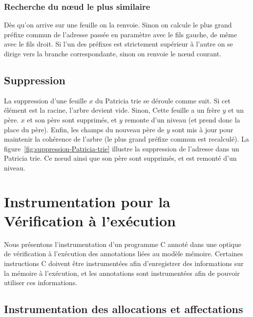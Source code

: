 \subsubsection*{Recherche du n\oe{}ud le plus similaire}


Dès qu'on arrive sur une feuille on la renvoie.
Sinon on calcule le plus grand préfixe commun de l'adresse passée en paramètre
avec le fils gauche, de même avec le fils droit.
Si l'un des préfixes est strictement supérieur à l'autre on se dirige vers la
branche correspondante, sinon on renvoie le n\oe{}ud courant.



\subsection{Suppression}





La suppression d'une feuille $x$ du Patricia trie se déroule comme suit.
Si cet élément est la racine, l'arbre devient vide.
Sinon, Cette feuille a un frère $y$ et un père.
$x$ et son père sont supprimés, et $y$ remonte d'un niveau (et prend donc la
place du père).
Enfin, les champs du nouveau père de $y$ sont mis à jour pour maintenir la
cohérence de l'arbre (le plus grand préfixe commun est recalculé).
La figure~\ref{fig:suppression-Patricia-trie} illustre la suppression de
l'adresse  dans un Patricia trie.
Ce n\oe{}ud ainsi que son père  sont supprimés, et
 est remonté d'un niveau.


\section{Instrumentation pour la Vérification à l'exécution}
\label{sec:mem-instru}


Nous présentons l'instrumentation d'un programme C annoté dans une optique de
vérification à l'exécution des annotations liées au modèle mémoire.
Certaines instructions C doivent être instrumentées afin d'enregistrer
des informations sur la mémoire à l'exécution, et les annotations sont
instrumentées afin de pouvoir utiliser ces informations.


\subsection{Instrumentation des allocations et affectations}


